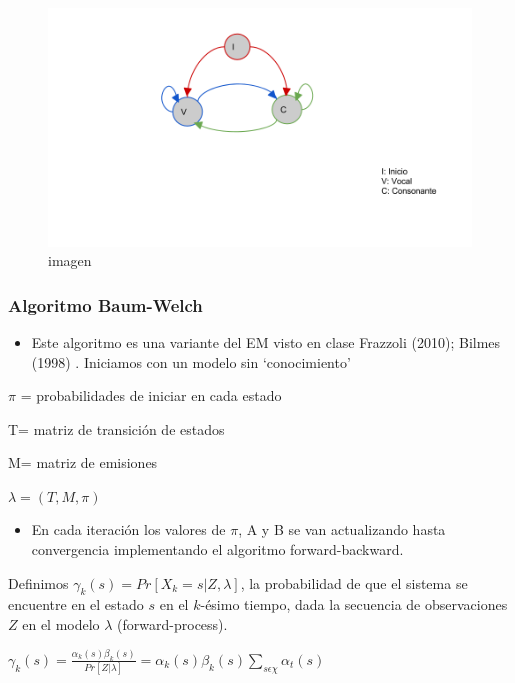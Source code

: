 \documentclass[]{article}
\begin{document}
\begin{figure}[htbp]
\centering
\includegraphics{modelo_vocales.png}
\caption{imagen}
\end{figure}

\subsubsection{Algoritmo Baum-Welch}\label{algoritmo-baum-welch}

\begin{itemize}
\itemsep1pt\parskip0pt
\item
  Este algoritmo es una variante del EM visto en clase Frazzoli (2010);
  Bilmes (1998) . Iniciamos con un modelo sin `conocimiento'
\end{itemize}

$\pi$ = probabilidades de iniciar en cada estado

T= matriz de transición de estados

M= matriz de emisiones

$\lambda=(T,M,\pi)$

\begin{itemize}
\itemsep1pt\parskip0pt
\item
  En cada iteración los valores de $\pi$, A y B se van actualizando
  hasta convergencia implementando el algoritmo forward-backward.
\end{itemize}

Definimos $\gamma_{k}(s)=Pr[X_{k}= s|Z,\lambda]$, la probabilidad de que
el sistema se encuentre en el estado $s$ en el $k$-ésimo tiempo, dada la
secuencia de observaciones $Z$ en el modelo $\lambda$ (forward-process).

$\gamma_{k}(s)=\frac{\alpha_{k}(s)\beta_{k}(s)}{Pr[Z|\lambda]}=\alpha_{k}(s)\beta_{k}(s){\sum_{s\epsilon\chi}\alpha_{t}(s)}$
\end{document}
